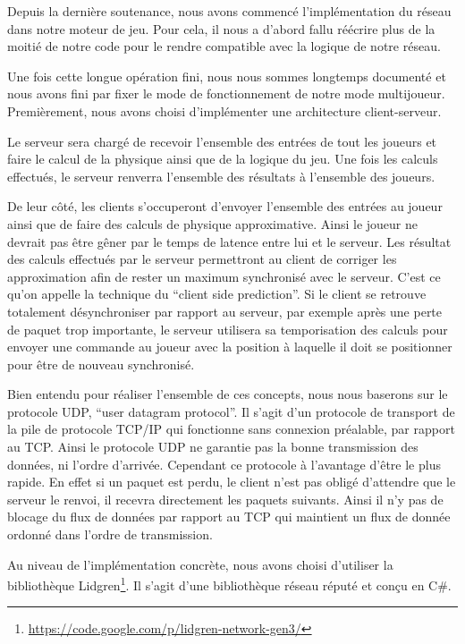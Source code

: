 \documentclass[11pt]{report}
\begin{document}
Depuis la dernière soutenance, nous avons commencé l'implémentation du réseau dans notre moteur de jeu. Pour cela, il nous a d'abord fallu réécrire plus de la moitié de notre code pour le rendre compatible avec la logique de notre réseau.

Une fois cette longue opération fini, nous nous sommes longtemps documenté et nous avons fini par fixer le mode de fonctionnement de notre mode multijoueur. Premièrement, nous avons choisi d'implémenter une architecture client-serveur. 

Le serveur sera chargé de recevoir l'ensemble des entrées de tout les joueurs et faire le calcul de la physique ainsi que de la logique du jeu. Une fois les calculs effectués, le serveur renverra l'ensemble des résultats à l'ensemble des joueurs.

De leur côté, les clients s'occuperont d'envoyer l'ensemble des entrées au joueur ainsi que de faire des calculs de physique approximative. Ainsi le joueur ne devrait pas être gêner par le temps de latence entre lui et le serveur. Les résultat des calculs effectués par le serveur permettront au client de corriger les approximation afin de rester un maximum synchronisé avec le serveur. C'est ce qu'on appelle la technique du ``client side prediction''. Si le client se retrouve totalement désynchroniser par rapport au serveur, par exemple après une perte de paquet trop importante, le serveur utilisera sa temporisation des calculs pour envoyer une commande au joueur avec la position à laquelle il doit se positionner pour être de nouveau synchronisé.

Bien entendu pour réaliser l'ensemble de ces concepts, nous nous baserons sur le protocole UDP, ``user datagram protocol''. Il s'agit d'un protocole de transport de la pile de protocole TCP/IP qui fonctionne sans connexion préalable, par rapport au TCP. Ainsi le protocole UDP ne garantie pas la bonne transmission des données, ni l'ordre d'arrivée. Cependant ce protocole à l'avantage d'être le plus rapide. En effet si un paquet est perdu, le client n'est pas obligé d'attendre que le serveur le renvoi, il recevra directement les paquets suivants. Ainsi il n'y pas de blocage du flux de données par rapport au TCP qui maintient un flux de donnée ordonné dans l'ordre de transmission.

Au niveau de l'implémentation concrète, nous avons choisi d'utiliser la bibliothèque Lidgren\footnote{\url{https://code.google.com/p/lidgren-network-gen3/}}. Il s'agit d'une bibliothèque réseau réputé et conçu en C\#.
\end{document}
